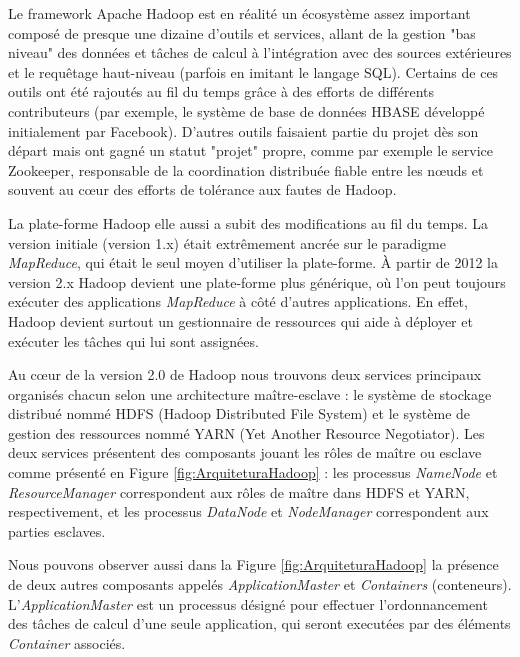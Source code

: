 Le framework Apache Hadoop est en réalité un écosystème assez important composé de presque une dizaine d'outils et services, allant de la gestion "bas niveau" des données et tâches de calcul à l'intégration avec des sources extérieures et le requêtage haut-niveau (parfois en imitant le langage SQL). Certains de ces outils ont été rajoutés au fil du temps grâce à des efforts de différents contributeurs (par exemple, le système de base de données HBASE développé initialement par Facebook). D'autres outils faisaient partie du projet dès son départ mais ont gagné un statut "projet" propre, comme par exemple le service Zookeeper, responsable de la coordination distribuée fiable entre les n{\oe}uds et souvent au c{\oe}ur des efforts de tolérance aux fautes de Hadoop.

La plate-forme Hadoop elle aussi a subit des modifications au fil du temps. La version initiale (version 1.x) était extrêmement ancrée sur le paradigme \textit{MapReduce}, qui était le seul moyen d'utiliser la plate-forme. À partir de 2012 la version 2.x Hadoop devient une plate-forme plus générique, où l'on peut toujours exécuter des applications \textit{MapReduce} à côté d'autres applications. En effet, Hadoop devient surtout un gestionnaire de ressources qui aide à déployer et exécuter les tâches qui lui sont assignées.  

Au c{\oe}ur de la version 2.0 de Hadoop nous trouvons deux services principaux organisés chacun selon une architecture maître-esclave : le système de stockage distribué nommé HDFS (Hadoop Distributed File System) et le système de gestion des ressources nommé YARN (Yet Another Resource Negotiator). Les deux services présentent des composants jouant les rôles de maître ou esclave comme présenté en Figure \ref{fig:ArquiteturaHadoop} : les processus \textit{NameNode} et \textit{ResourceManager} correspondent aux rôles de maître dans HDFS et YARN, respectivement, et les processus \textit{DataNode} et \textit{NodeManager} correspondent aux parties esclaves. 

Nous pouvons observer aussi dans la Figure \ref{fig:ArquiteturaHadoop} la présence de deux autres composants appelés \textit{ApplicationMaster} et \textit{Containers} (conteneurs). L'\textit{ApplicationMaster} est un processus désigné pour effectuer l'ordonnancement des tâches de calcul d'une seule application, qui seront executées par des éléments \textit{Container} associés.  

